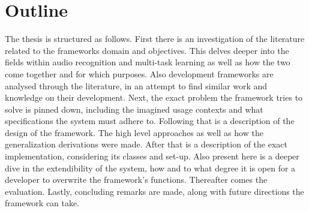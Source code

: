\section{Outline}

The thesis is structured as follows. First there is an investigation of the literature related to the frameworks domain and objectives. This delves deeper into the fields within audio recognition and multi-task learning as well as how the two come together and for which purposes. Also development frameworks are analysed through the literature, in an attempt to find similar work and knowledge on their development. Next, the exact problem the framework tries to solve is pinned down, including the imagined usage contexts and what specifications the system must adhere to. Following that is a description of the design of the framework. The high level approaches as well as how the generalization derivations were made. After that is a description of the exact implementation, considering its classes and set-up. Also present here is a deeper dive in the extendibility of the system, how and to what degree it is open for a developer to overwrite the framework's functions. Thereafter comes the evaluation. Lastly, concluding remarks are made, along with future directions the framework can take.
